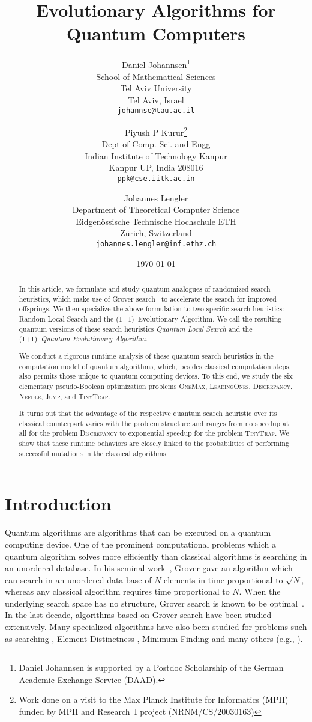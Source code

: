 \documentclass[a4paper,11pt]{article}
\title{Evolutionary Algorithms for Quantum Computers}
\author{Daniel Johannsen\thanks{Daniel Johannsen is supported by a Postdoc Scholarship of the German Academic Exchange Service (DAAD).}\\
School of Mathematical Sciences\\
Tel Aviv University\\
Tel Aviv, Israel\\
 {\tt johannse@tau.ac.il}
 \and Piyush P Kurur\thanks{Work done on a visit to the Max Planck Institute for Informatics (MPII) funded by MPII and Research~I project (NRNM/CS/20030163)}
 \\
 Dept of Comp. Sci. and Engg\\
 Indian Institute of Technology Kanpur\\
 Kanpur UP, India 208016\\
 {\tt ppk@cse.iitk.ac.in}
 \and Johannes Lengler\\
 Department of Theoretical Computer Science\\
 Eidgen{\"o}ssische Technische Hochschule ETH\\
 Z{\"u}rich, Switzerland\\
 {\tt johannes.lengler@inf.ethz.ch}}
\date{\today}
\begin{document}
\maketitle

\newpage

\begin{abstract}
 In this article, we formulate and study quantum analogues of randomized search heuristics, which make use of Grover search~\cite{Grover96} to accelerate the search for improved offsprings. We then specialize the above formulation to two specific search heuristics: Random Local Search and the (1+1)~Evolutionary Algorithm. We call the resulting quantum versions of these search heuristics \emph{Quantum Local Search} and the (1+1)~\emph{Quantum Evolutionary Algorithm}.

We conduct a rigorous runtime analysis of these quantum search heuristics in the computation model of quantum algorithms, which, besides classical computation steps, also permits those unique to quantum computing devices. To this end, we study the six elementary pseudo-Boolean optimization problems \textsc{OneMax}, \textsc{LeadingOnes}, \textsc{Discrepancy}, \textsc{Needle}, \textsc{Jump}, and \textsc{TinyTrap}.

It turns out that the advantage of the respective quantum search heuristic over its classical counterpart varies with the problem structure and ranges from no speedup at all for the problem \textsc{Discrepancy} to exponential speedup for the problem \textsc{TinyTrap}. We show that these runtime behaviors are closely linked to the probabilities of performing successful mutations in the classical algorithms.
\end{abstract}

\newpage

\section{Introduction}
\label{sec:introduction}
Quantum algorithms are algorithms that can be executed on a quantum computing device. One of the prominent computational problems which a quantum algorithm solves more efficiently than classical algorithms is searching in an unordered database. In his seminal work~\cite{Grover96, nielsenchuang:book}, Grover gave an algorithm which can search in an unordered data base of $N$ elements in time proportional to $\sqrt{N}$, whereas any classical algorithm requires time proportional to $N$. When the underlying search space has no structure, Grover search is known to be optimal~\cite{BennetBBGV1997,Zalka99}. In the last decade, algorithms based on Grover search have been studied extensively. Many specialized algorithms have also been studied for problems such as searching \cite{Grover96,BoyerBHT98}, Element Distinctness \cite{Santha08}, Minimum-Finding \cite{DurrH96} and many others (e.g., \cite{DurrHHM06,BerzinaDFLS04,Zhangthesis06}).
\end{document}
